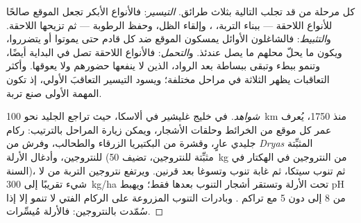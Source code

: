 \begin{proposition}\label{prop:b1:ecosystem-dynamics:mechanisms}
كل مرحلة من  قد تجلب التالية بثلاث طرائق.
\emph{التيسير}: فالأنواع الأبكر تجعل الموقع صالحًا
للأنواع اللاحقة --- ببناء التربة، ، وإلقاء الظل،
وحفظ الرطوبة --- ثم تزيحها اللاحقة. و\emph{التثبيط}:
فالشاغلون الأوائل يمسكون الموقع ضد كل قادم حتى يموتوا
أو يتضرروا، ويكون ما يحلّ محلهم ما يصل عندئذ.
و\emph{التحمل}: فالأنواع اللاحقة تصل في البداية أيضًا، وتنمو
ببطء وتبقى ببساطة بعد الرواد، الذين لا ينفعها حضورهم
ولا يعوقها. وأكثر التعاقبات يظهر الثلاثة في مراحل
مختلفة؛ ويسود التيسير التعاقبَ الأولي، إذ تكون المهمة
الأولى صنع تربة.
\end{proposition}
\begin{proof}[شواهد]
في خليج غليشير في ألاسكا، حيث تراجع الجليد نحو
\qty{100}{km} منذ 1750، يُعرف عمر كل موقع من الخرائط
وحلقات الأشجار، ويمكن زيارة المراحل بالترتيب: ركام جليدي عارٍ،
وقشرة من البكتيريا الزرقاء والطحالب، وفرش من
\emph{Dryas} المثبِّتة للنتروجين، وأدغال الأرلة (مثبِّتة للنتروجين، تضيف
\qty{50}{kg} من النتروجين في الهكتار في السنة)، ثم تنوب سيتكا،
ثم غابة تنوب وتسوغا بعد قرنين. ويرتفع نتروجين التربة
من لا شيء تقريبًا إلى \qty{300}{kg/ha} تحت الأرلة وتستقر
أشجار التنوب بعدها فقط؛ ويهبط pH من 8 إلى دون 5 مع
تراكم . وبادرات التنوب المزروعة على الركام الفتي
لا تنمو إلا إذا سُمّدت بالنتروجين: فالأرلة مُيسِّرات.
\end{proof}

